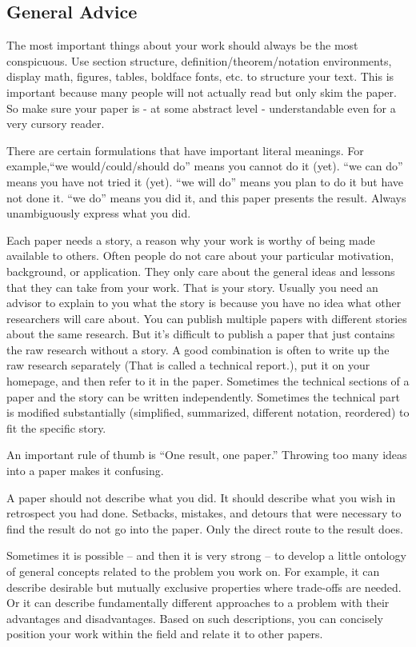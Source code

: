 \documentclass[12pt]{article}
\begin{document}
\subsection{General Advice}

The most important things about your work should always be the most conspicuous.
Use section structure, definition/theorem/notation environments, display math, figures, tables, boldface fonts, etc. to structure your text.
This is important because many people will not actually read but only skim the paper.
So make sure your paper is - at some abstract level - understandable even for a very cursory reader.
\medskip

There are certain formulations that have important literal meanings.
For example,``we would/could/should do'' means you cannot do it (yet).
``we can do'' means you have not tried it (yet).
``we will do'' means you plan to do it but have not done it.
``we do'' means you did it, and this paper presents the result.
Always unambiguously express what you did.
\medskip

Each paper needs a story, a reason why your work is worthy of being made available to others.
Often people do not care about your particular motivation, background, or application.
They only care about the general ideas and lessons that they can take from your work. That is your story.
Usually you need an advisor to explain to you what the story is because you have no idea what other researchers will care about.
You can publish multiple papers with different stories about the same research. But it's difficult to publish a paper that just contains the raw research without a story.
A good combination is often to write up the raw research separately (That is called a technical report.), put it on your homepage, and then refer to it in the paper.
Sometimes the technical sections of a paper and the story can be written independently. Sometimes the technical part is modified substantially (simplified, summarized, different notation, reordered) to fit the specific story.
\medskip

An important rule of thumb is ``One result, one paper.''
Throwing too many ideas into a paper makes it confusing.
\medskip

A paper should not describe what you did.
It should describe what you wish in retrospect you had done.
Setbacks, mistakes, and detours that were necessary to find the result do not go into the paper.
Only the direct route to the result does.
\medskip

Sometimes it is possible -- and then it is very strong -- to develop a little ontology of general concepts related to the problem you work on.
For example, it can describe desirable but mutually exclusive properties where trade-offs are needed.
Or it can describe fundamentally different approaches to a problem with their advantages and disadvantages.
Based on such descriptions, you can concisely position your work within the field and relate it to other papers.
\end{document}
